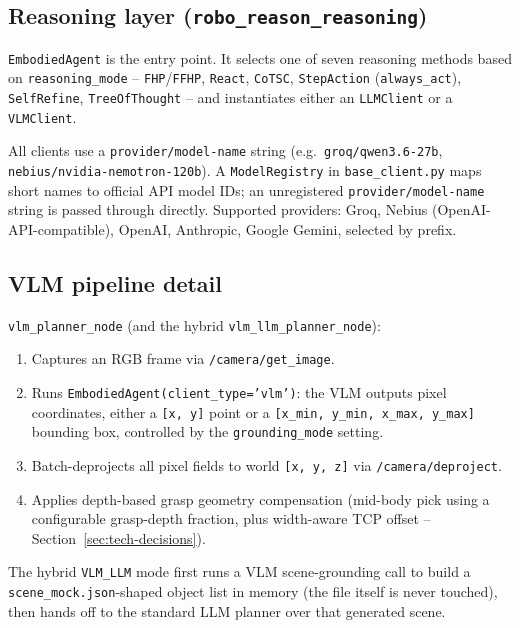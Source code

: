 \subsection{Reasoning layer (\texttt{robo\_reason\_reasoning})}

\texttt{EmbodiedAgent} is the entry point. It selects one of seven reasoning
methods based on \texttt{reasoning\_mode} --
\texttt{FHP}/\texttt{FFHP}, \texttt{React}, \texttt{CoTSC}, \texttt{StepAction}
(\texttt{always\_act}), \texttt{SelfRefine}, \texttt{TreeOfThought} -- and
instantiates either an \texttt{LLMClient} or a \texttt{VLMClient}.

All clients use a \texttt{provider/model-name} string (e.g.\
\texttt{groq/qwen3.6-27b}, \texttt{nebius/nvidia-nemotron-120b}). A
\texttt{ModelRegistry} in \texttt{base\_client.py} maps short names to
official API model IDs; an unregistered \texttt{provider/model-name} string
is passed through directly. Supported providers: Groq, Nebius
(OpenAI-API-compatible), OpenAI, Anthropic, Google Gemini, selected by
prefix.

\subsection{VLM pipeline detail}

\texttt{vlm\_planner\_node} (and the hybrid \texttt{vlm\_llm\_planner\_node}):
\begin{enumerate}[nosep]
  \item Captures an RGB frame via \texttt{/camera/get\_image}.
  \item Runs \texttt{EmbodiedAgent(client\_type='vlm')}: the VLM outputs pixel
    coordinates, either a \texttt{[x, y]} point or a
    \texttt{[x\_min, y\_min, x\_max, y\_max]} bounding box, controlled by the
    \texttt{grounding\_mode} setting.
  \item Batch-deprojects all pixel fields to world \texttt{[x, y, z]} via
    \texttt{/camera/deproject}.
  \item Applies depth-based grasp geometry compensation (mid-body pick using
    a configurable grasp-depth fraction, plus width-aware TCP offset --
    Section~\ref{sec:tech-decisions}).
\end{enumerate}

The hybrid \texttt{VLM\_LLM} mode first runs a VLM scene-grounding call to
build a \texttt{scene\_mock.json}-shaped object list in memory (the file
itself is never touched), then hands off to the standard LLM planner over
that generated scene.


